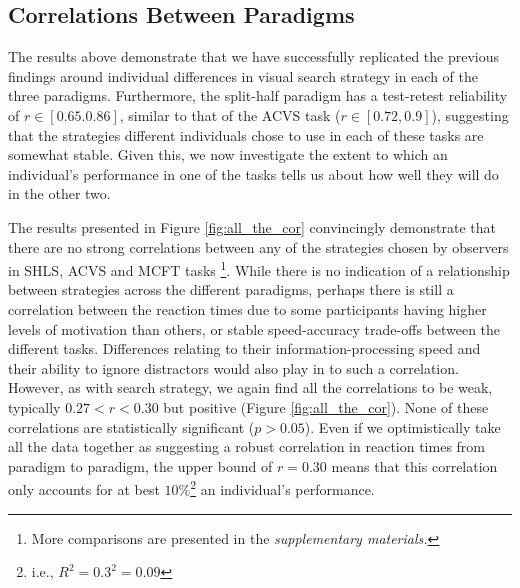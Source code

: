 \documentclass[]{rsos}%
\begin{document}
\subsection{Correlations Between Paradigms}

The results above demonstrate that we have successfully replicated the previous findings around individual differences in visual search strategy in each of the three paradigms. Furthermore, the split-half paradigm has a test-retest reliability of $r \in [0.65. 0.86]$, similar to that of the ACVS task ($r \in [0.72, 0.9]$), suggesting that the strategies different individuals chose to use in each of these tasks are somewhat stable. Given this, we now investigate the extent to which an individual's performance in one of the tasks tells us about how well they will do in the other two. 


The results presented in Figure \ref{fig:all_the_cor} convincingly demonstrate that there are no strong correlations between any of the strategies chosen by observers in SHLS, ACVS and MCFT tasks \footnote{More comparisons are presented in the \textit{supplementary materials.}}. 
While there is no indication of a relationship between strategies across the different paradigms, perhaps there is still a correlation between the reaction times due to some participants having higher levels of motivation than others, or stable speed-accuracy trade-offs between the different tasks. Differences relating to their information-processing speed and their ability to ignore distractors would also play in to such a correlation. However, as with search strategy, we again find all the correlations to be weak, typically $0.27 < r <0.30$ but positive (Figure \ref{fig:all_the_cor}). None of these correlations are statistically significant ($p>0.05$). Even if we optimistically take all the data together as suggesting a robust correlation in reaction times from paradigm to paradigm, the upper bound of $r=0.30$ means that this correlation only accounts for at best $10\%$\footnote{i.e., $R^2 = 0.3^2 = 0.09$} an individual's performance. 

\end{document}
